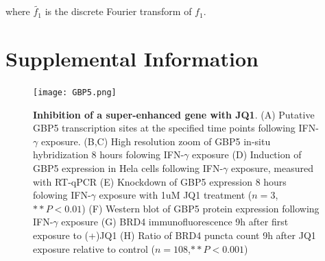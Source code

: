 \documentclass{ucetd}
\begin{document}
where $\tilde{f_{1}}$ is the discrete Fourier transform of $f_{1}$.

\section{Supplemental Information}

\begin{figure}
\begin{center}
\texttt{[image: GBP5.png]}
\end{center}
\caption{\textbf{Inhibition of a super-enhanced gene with JQ1}. (A) Putative GBP5 transcription sites at the specified time points following IFN-$\gamma$ exposure. (B,C) High resolution zoom of GBP5 in-situ hybridization 8 hours folowing IFN-$\gamma$ exposure (D) Induction of GBP5 expression in Hela cells following IFN-$\gamma$ exposure, measured with RT-qPCR (E) Knockdown of GBP5 expression 8 hours folowing IFN-$\gamma$ exposure with 1uM JQ1 treatment ($n=3$,$** P < 0.01$) (F) Western blot of GBP5 protein expression following IFN-$\gamma$ exposure (G) BRD4 immunofluorescence 9h after first exposure to (+)JQ1 (H) Ratio of BRD4 puncta count 9h after JQ1 exposure relative to control ($n=108$,$** P < 0.001$)}
\end{figure}


\end{document}
